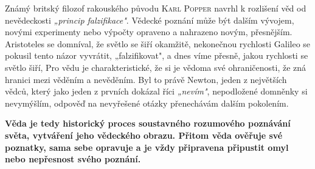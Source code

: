       Známý britský filozof rakouského původu \textsc{Karl Popper} navrhl k rozlišení věd od
      nevědeckosti \emph{„princip falzifikace"}. Vědecké poznání může být dalším vývojem, novými
      experimenty nebo výpočty opraveno a nahrazeno novým, přesnějším. Aristoteles se domníval, že
      světlo se šiří okamžitě, nekonečnou rychlosti Galileo se pokusil tento názor vyvrátit,
      „falzifikovat", a dnes víme přesně, jakou rychlosti se světlo šiří, Pro vědu je
      charakteristické, že si je vědoma své ohraničenosti, že zná hranici mezi věděním a nevěděním.
      Byl to právě Newton, jeden z největších vědců, který jako jeden z prvních dokázal říci
      \emph{„nevím"}, nepodložené domněnky si nevymýšlím, odpověď na nevyřešené otázky přenechávám
      dalším pokolením.

      \textbf{Věda je tedy historický proces soustavného rozumového poznávání světa, vytváření jeho
      vědeckého obrazu. Přitom věda ověřuje své poznatky, sama sebe opravuje a je vždy připravena
      připustit omyl nebo nepřesnost svého poznání. \cite[s.~15]{Stoll2009}}

